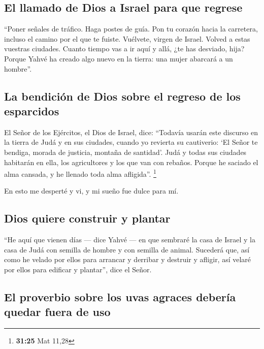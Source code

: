 \hypertarget{el-llamado-de-dios-a-israel-para-que-regrese}{%
\subsection{El llamado de Dios a Israel para que
regrese}\label{el-llamado-de-dios-a-israel-para-que-regrese}}

 ``Poner señales de tráfico. Haga postes de guía. Pon tu
corazón hacia la carretera, incluso el camino por el que te fuiste.
Vuélvete, virgen de Israel. Volved a estas vuestras ciudades.
 Cuanto tiempo vas a ir aquí y allá, ¿te has desviado,
hija? Porque Yahvé ha creado algo nuevo en la tierra: una mujer abarcará
a un hombre''.

\hypertarget{la-bendiciuxf3n-de-dios-sobre-el-regreso-de-los-esparcidos}{%
\subsection{La bendición de Dios sobre el regreso de los
esparcidos}\label{la-bendiciuxf3n-de-dios-sobre-el-regreso-de-los-esparcidos}}

 El Señor de los Ejércitos, el Dios de Israel, dice:
``Todavía usarán este discurso en la tierra de Judá y en sus ciudades,
cuando yo revierta su cautiverio: `El Señor te bendiga, morada de
justicia, montaña de santidad'.  Judá y todas sus
ciudades habitarán en ella, los agricultores y los que van con rebaños.
 Porque he saciado el alma cansada, y he llenado toda
alma afligida''. \footnote{\textbf{31:25} Mat 11,28}

 En esto me desperté y vi, y mi sueño fue dulce para mí.

\hypertarget{dios-quiere-construir-y-plantar}{%
\subsection{Dios quiere construir y
plantar}\label{dios-quiere-construir-y-plantar}}

 ``He aquí que vienen días --- dice Yahvé --- en que
sembraré la casa de Israel y la casa de Judá con semilla de hombre y con
semilla de animal.  Sucederá que, así como he velado por
ellos para arrancar y derribar y destruir y afligir, así velaré por
ellos para edificar y plantar'', dice el Señor.

\hypertarget{el-proverbio-sobre-los-uvas-agraces-deberuxeda-quedar-fuera-de-uso}{%
\subsection{El proverbio sobre los uvas agraces debería quedar fuera de
uso}\label{el-proverbio-sobre-los-uvas-agraces-deberuxeda-quedar-fuera-de-uso}}

